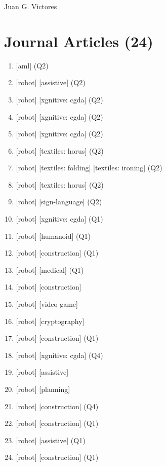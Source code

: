 \documentclass{article}
\def\name{Juan G. Victores}
\begin{document}
{\huge \name}

\vspace{0.2in}



\section*{Journal Articles (24)}
\begin{enumerate}
  \item {} [aml] (Q2)
  \item {} [robot] [assistive] (Q2)
  \item {} [robot] [xgnitive: cgda] (Q2)
  \item {} [robot] [xgnitive: cgda] (Q2)
  \item {} [robot] [xgnitive: cgda] (Q2)
  \item {} [robot] [textiles: horus] (Q2)
  \item {} [robot] [textiles: folding] [textiles: ironing] (Q2)
  \item {} [robot] [textiles: horus] (Q2)
  \item {} [robot] [sign-language] (Q2)
  \item {} [robot] [xgnitive: cgda] (Q1)
  \item {} [robot] [humanoid] (Q1)
  \item {} [robot] [construction] (Q1)
  \item {} [robot] [medical] (Q1)
  \item {} [robot] [construction]
  \item {} [robot] [video-game]
  \item {} [robot] [cryptography]
  \item {} [robot] [construction] (Q1)
  \item {} [robot] [xgnitive: cgda] (Q4)
  \item {} [robot] [assistive]
  \item {} [robot] [planning]
  \item {} [robot] [construction] (Q4)
  \item {} [robot] [construction] (Q1)
  \item {} [robot] [assistive] (Q1)
  \item {} [robot] [construction] (Q1)
\end{enumerate}
\end{document}
